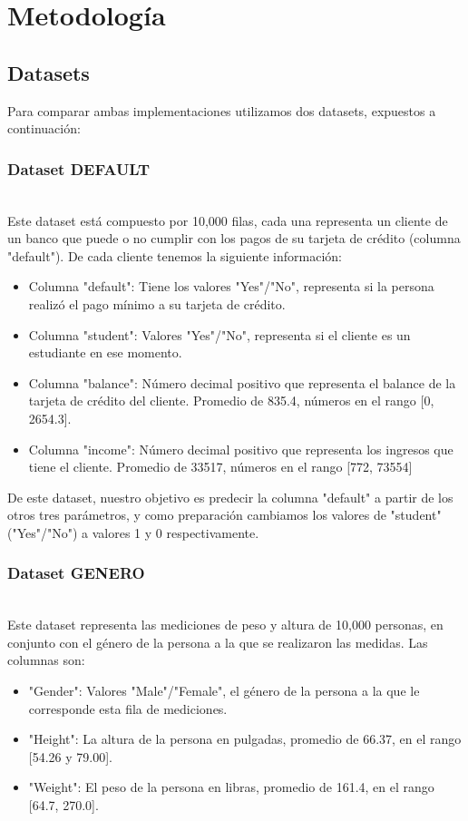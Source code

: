 \documentclass[sigconf,authorversion,nonacm]{acmart}
\begin{document}
\section{Metodología}

\subsection{Datasets}
Para comparar ambas implementaciones utilizamos dos datasets, expuestos a continuación:

\subsubsection{Dataset DEFAULT}\hfill\\
Este dataset está compuesto por 10,000 filas, cada una representa un cliente de un banco que puede o no cumplir con los pagos de su tarjeta de crédito (columna "default"). De cada cliente tenemos la siguiente información:
\begin{itemize}
  \item Columna "default": Tiene los valores "Yes"/"No", representa si la persona realizó el pago mínimo a su tarjeta de crédito.
  \item Columna "student": Valores "Yes"/"No", representa si el cliente es un estudiante en ese momento.
  \item Columna "balance": Número decimal positivo que representa el balance de la tarjeta de crédito del cliente. Promedio de 835.4, números en el rango [0, 2654.3].
  \item Columna "income": Número decimal positivo que representa los ingresos que tiene el cliente. Promedio de 33517, números en el rango [772, 73554]
\end{itemize}

De este dataset, nuestro objetivo es predecir la columna "default" a partir de los otros tres parámetros, y como preparación cambiamos los valores de "student" ("Yes"/"No") a valores 1 y 0 respectivamente.


\subsubsection{Dataset GENERO}\hfill\\
Este dataset representa las mediciones de peso y altura de 10,000 personas, en conjunto con el género de la persona a la que se realizaron las medidas. Las columnas son:
\begin{itemize}
  \item "Gender": Valores "Male"/"Female", el género de la persona a la que le corresponde esta fila de mediciones.
  \item "Height": La altura de la persona en pulgadas, promedio de 66.37, en el rango [54.26 y 79.00].
  \item "Weight": El peso de la persona en libras, promedio de 161.4, en el rango [64.7, 270.0].
\end{itemize}
\end{document}

